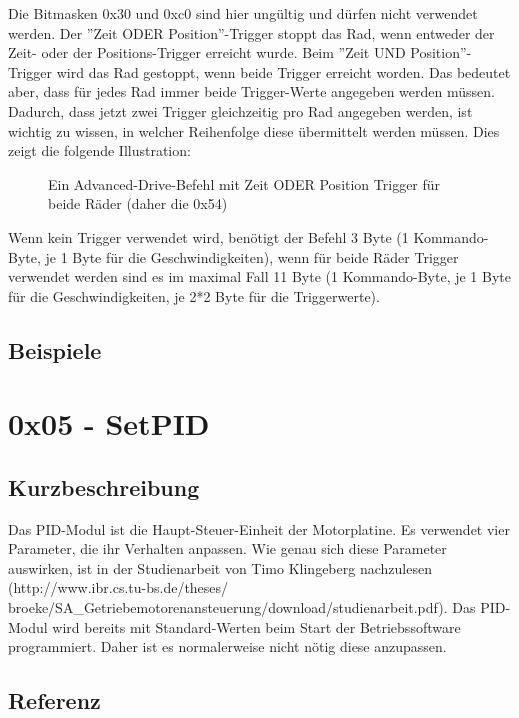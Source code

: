 \documentclass[a4paper]{article}
\begin{document}
	Die Bitmasken 0x30 und 0xc0 sind hier ungültig und dürfen nicht verwendet werden.
	Der ''Zeit ODER Position''-Trigger stoppt das Rad, wenn entweder der Zeit- oder der
	Positions-Trigger erreicht wurde. Beim ''Zeit UND Position''-Trigger wird das Rad
	gestoppt, wenn beide Trigger erreicht worden. Das bedeutet aber, dass für jedes Rad
	immer beide Trigger-Werte angegeben werden müssen. Dadurch, dass jetzt zwei Trigger
	gleichzeitig pro Rad angegeben werden, ist wichtig zu wissen, in welcher Reihenfolge
	diese übermittelt werden müssen. Dies zeigt die folgende Illustration:
	\begin{figure}[!ht]
		\centering
		\caption{Ein Advanced-Drive-Befehl mit Zeit ODER Position Trigger für beide Räder (daher die 0x54)}
	\end{figure}
	Wenn kein Trigger verwendet wird, benötigt der Befehl 3 Byte (1 Kommando-Byte,
	je 1 Byte für die Geschwindigkeiten), wenn für beide Räder Trigger verwendet
	werden sind es im maximal Fall 11 Byte (1 Kommando-Byte, je 1 Byte für die
	Geschwindigkeiten, je 2*2 Byte für die Triggerwerte).

	\subsection{Beispiele}
	\pagebreak


	\section{0x05 - SetPID}

	\subsection{Kurzbeschreibung}

	Das PID-Modul ist die Haupt-Steuer-Einheit der Motorplatine.
	Es verwendet vier Parameter, die ihr Verhalten anpassen. Wie
	genau sich diese Parameter auswirken, ist in der Studienarbeit
	von Timo Klingeberg nachzulesen (http://www.ibr.cs.tu-bs.de/theses/
	broeke/SA\_Getriebemotorenansteuerung/download/studienarbeit.pdf).
	Das PID-Modul wird bereits mit Standard-Werten beim Start der
	Betriebssoftware programmiert. Daher ist es normalerweise nicht
	nötig diese anzupassen.


	\subsection{Referenz}
\end{document}
